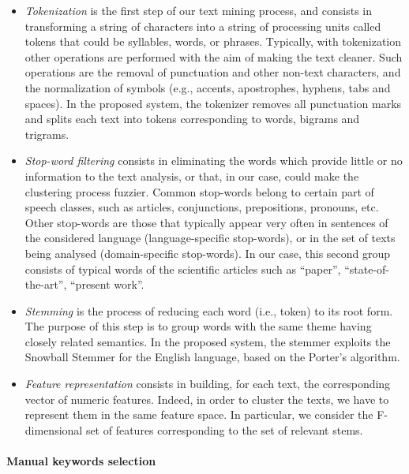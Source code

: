 \documentclass[]{book}
\providecommand{\tightlist}{%
  \setlength{\itemsep}{0pt}\setlength{\parskip}{0pt}}
\let\oldparagraph\paragraph
\renewcommand{\paragraph}[1]{\oldparagraph{#1}\mbox{}}
\begin{document}
\begin{itemize}
\tightlist
\item
  \emph{Tokenization} is the first step of our text mining process, and
  consists in transforming a string of characters into a string of
  processing units called tokens that could be syllables, words, or
  phrases. Typically, with tokenization other operations are performed
  with the aim of making the text cleaner. Such operations are the
  removal of punctuation and other non-text characters, and the
  normalization of symbols (e.g., accents, apostrophes, hyphens, tabs
  and spaces). In the proposed system, the tokenizer removes all
  punctuation marks and splits each text into tokens corresponding to
  words, bigrams and trigrams.
\item
  \emph{Stop-word filtering} consists in eliminating the words which
  provide little or no information to the text analysis, or that, in our
  case, could make the clustering process fuzzier. Common stop-words
  belong to certain part of speech classes, such as articles,
  conjunctions, prepositions, pronouns, etc. Other stop-words are those
  that typically appear very often in sentences of the considered
  language (language-specific stop-words), or in the set of texts being
  analysed (domain-specific stop-words). In our case, this second group
  consists of typical words of the scientific articles such as
  ``paper'', ``state-of-the-art'', ``present work''.
\item
  \emph{Stemming} is the process of reducing each word (i.e., token) to
  its root form. The purpose of this step is to group words with the
  same theme having closely related semantics. In the proposed system,
  the stemmer exploits the Snowball Stemmer for the English language,
  based on the Porter's algorithm.
\item
  \emph{Feature representation} consists in building, for each text, the
  corresponding vector of numeric features. Indeed, in order to cluster
  the texts, we have to represent them in the same feature space. In
  particular, we consider the F- dimensional set of features
  corresponding to the set of relevant stems.
\end{itemize}

\paragraph{Manual keywords selection}\label{manual-keywords-selection}
\end{document}
